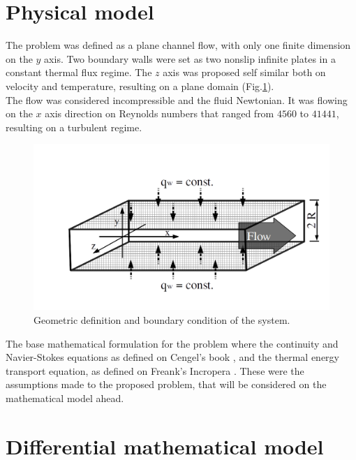 \documentclass[10pt]{article} %
\begin{document}
\section{Physical model}

The problem was defined as a plane channel flow, with only one finite dimension on the $y$ axis. Two boundary walls were set as two nonslip infinite plates in a constant thermal flux regime. The $z$ axis was proposed self similar both on velocity and temperature, resulting on a plane domain (Fig.\ref{figure.1}). \\
The flow was considered incompressible and the fluid Newtonian. It was flowing on the $x$ axis direction on Reynolds numbers that ranged from $4560$ to $41441$, resulting on a turbulent regime. 

\begin{figure}[h!]
	\centering
	\includegraphics[angle=0, scale=0.50]{canal1}
	\caption{Geometric definition and boundary condition of the system.}
	\label{figure.1}
\end{figure}

The base mathematical formulation for the problem where the continuity and Navier-Stokes equations as defined on Cengel's book \cite{Cengel}, and the thermal energy transport equation, as defined on Freank's Incropera \cite{Incropera}. These were the assumptions made to the proposed problem, that will be considered on the mathematical model ahead.









\section{Differential mathematical model}
\end{document}
